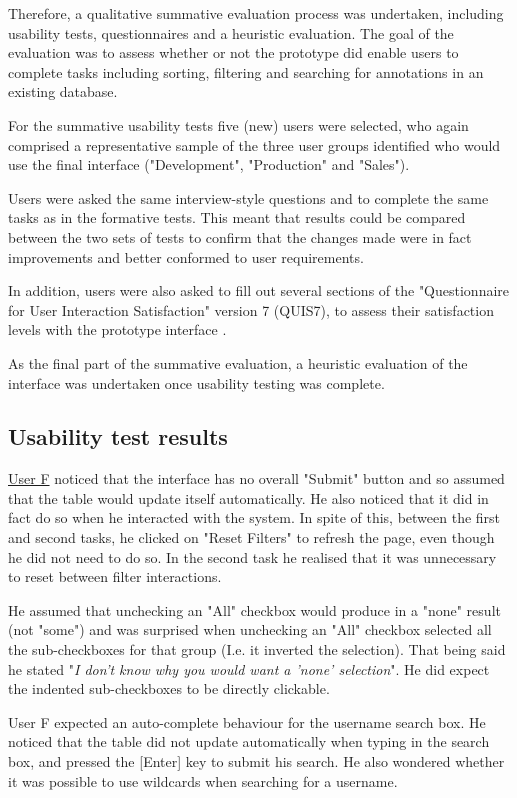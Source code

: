 Therefore, a qualitative summative evaluation process was undertaken, including usability tests, questionnaires and a heuristic evaluation. The goal of the evaluation was to assess whether or not the prototype did enable users to complete tasks including sorting, filtering and searching for annotations in an existing database.

For the summative usability tests five (new) users were selected, who again comprised a representative sample of the three user groups identified who would use the final interface ("Development", "Production" and "Sales").

Users were asked the same interview-style questions and to complete the same tasks as in the formative tests. This meant that results could be compared between the two sets of tests to confirm that the changes made were in fact improvements and better conformed to user requirements.

In addition, users were also asked to fill out several sections of the "Questionnaire for User Interaction Satisfaction" version 7 (QUIS7), to assess their satisfaction levels with the prototype interface \citep{QUIS}. 

As the final part of the summative evaluation, a heuristic evaluation of the interface was undertaken once usability testing was complete. 

\subsection{Usability test results}

\underline{User F} noticed that the interface has no overall "Submit" button and so assumed that the table would update itself automatically. He also noticed that it did in fact do so when he interacted with the system. In spite of this, between the first and second tasks, he clicked on "Reset Filters" to refresh the page, even though he did not need to do so. In the second task he realised that it was unnecessary to reset between filter interactions. 

He assumed that unchecking an "All" checkbox would produce in a "none" result (not "some") and was surprised when unchecking an "All" checkbox selected all the sub-checkboxes for that group (I.e. it inverted the selection). That being said he stated "\textit{I don't know why you would want a 'none' selection}". He did expect the indented sub-checkboxes to be directly clickable.

User F expected an auto-complete behaviour for the username search box. He noticed that the table did not update automatically when typing in the search box, and pressed the [Enter] key to submit his search. He also wondered whether it was possible to use wildcards when searching for a username.


